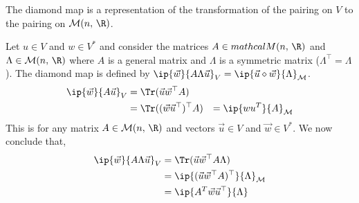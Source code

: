 The diamond map is a representation of the transformation of the pairing on $V$ to the pairing on $\mathcal{M}(n,\,\R)$.

\begin{eg}
  Let $u \in V$ and $w \in V^*$ and consider the matrices $A \in mathcal{M}(n,\,\R)$ and $\Lambda \in \mathcal{M}(n,\,\R)$ where $A$ is a general matrix and $\Lambda$ is a symmetric matrix ($\Lambda^\top = \Lambda$). The diamond map is defined by $\ip{\vec w}{A\Lambda\vec u}_V = \ip{\vec u \diamond \vec w}{\Lambda}_{\mathcal{M}}$.
  \begin{align*}
    \ip{\vec w}{A\vec u}_V &= \Tr(\vec u \vec w^\top A) \\
    &= \Tr((\vec w \vec u ^\top)^\top A)
    &= \ip{wu^T}{A}_{\mathcal{M}} \\
  \end{align*}
  This is for any matrix $A \in \mathcal{M}(n,\,\R)$ and vectors $\vec u \in V$ and $\vec w \in V^*$. We now conclude that,
  \begin{align*}
    \ip{\vec w}{A\Lambda \vec u}_V &= \Tr(\vec u \vec w^\top A\Lambda) \\
    &= \ip{(\vec u\vec w^\top A)^\top}{\Lambda}_{\mathcal{M}}\\
    &= \ip{A^T\vec w\vec u^\top}{\Lambda}
  \end{align*}
\end{eg}
